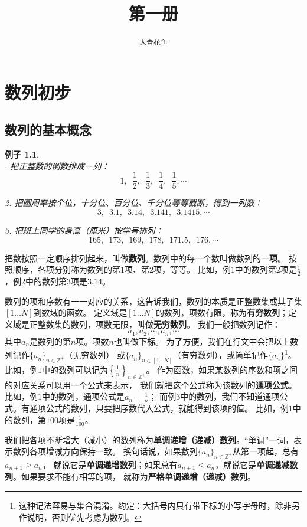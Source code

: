 \documentclass[12pt,UTF8]{ctexbook}
\title{\zihao{0} \bfseries 第一册}
\author{\zihao{2} \texttt{大青花鱼}}
\date{}
\newtheorem{ex}{例子}[section]
\begin{document}
\maketitle
\tableofcontents
\newpage

\chapter{数列初步}

\section{数列的基本概念}

\begin{ex}
    \mbox{}\\
    . 把正整数的倒数排成一列：
$$ 1,\,\,\, \frac{1}{2}, \,\,\, \frac{1}{3}, \,\,\,\frac{1}{4}, \,\,\,\frac{1}{5}, \cdots $$

2. 把圆周率按个位，十分位、百分位、千分位等等截断，得到一列数：
$$  3,\,\,\, 3.1,\,\,\, 3.14,\,\,\, 3.141,\,\,\, 3.1415, \cdots   $$

    3. 把班上同学的身高（厘米）按学号排列：
$$ 165,\,\,\, 173,\,\,\, 169,\,\,\, 178, \,\,\,171.5,\,\,\, 176, \cdots  $$
\end{ex}
把数按照一定顺序排列起来，叫做\textbf{数列}。数列中的每一个数叫做数列的一\textbf{项}。
按照顺序，各项分别称为数列的第$1$项、第$2$项，等等。
比如，例$1$中的数列第$2$项是$\frac{1}{2}$，例$2$中的数列第$3$项是$3.14$。

数列的项和序数有一一对应的关系，这告诉我们，数列的本质是正整数集或其子集$[1\ldots N]$到数域的函数。
定义域是$[1\ldots N]$的数列，项数有限，称为\textbf{有穷数列}；定义域是正整数集的数列，项数无限，叫做\textbf{无穷数列}。
我们一般把数列记作：
$$ a_1, a_2, \cdots, a_n, \cdots $$
其中$a_n$是数列的第$n$项。项数$n$也叫做\textbf{下标}。
为了方便，我们在行文中会把以上数列记作$\{a_n\}_{n\in\mathbb{Z}^+}$（无穷数列）
或$\{a_n\}_{n\in[1\ldots N]}$（有穷数列），或简单记作$\{a_n\}$\footnote{这种记法容易与集合混淆。约定：大括号内只有带下标的小写字母时，除非另作说明，否则优先考虑为数列。}。
比如，例$1$中的数列可以记为$\left\{\frac{1}{n}\right\}_{n\in\mathbb{Z}^+}$。
作为函数，如果某数列的序数和项之间的对应关系可以用一个公式来表示，
我们就把这个公式称为该数列的\textbf{通项公式}。比如，例$1$中的数列，通项公式是$a_n = \frac{1}{n}$；
而例$3$中的数列，我们不知道通项公式。有通项公式的数列，只要把序数代入公式，就能得到该项的值。
比如，例$1$中的数列，第$100$项是$\frac{1}{100}$。

我们把各项不断增大（减小）的数列称为\textbf{单调递增（递减）数列}。“单调”一词，表示数列各项增减方向保持一致。
换句话说，如果数列$\{a_n\}_{n\in\mathbb{Z}^+}$从第一项起，总有$a_{n+1} \geqslant a_n$，
就说它是\textbf{单调递增数列}；如果总有$a_{n+1} \leqslant a_n$，就说它是\textbf{单调递减数列}。如果要求不能有相等的项，
就称为\textbf{严格单调递增（递减）数列}。
\end{document}
